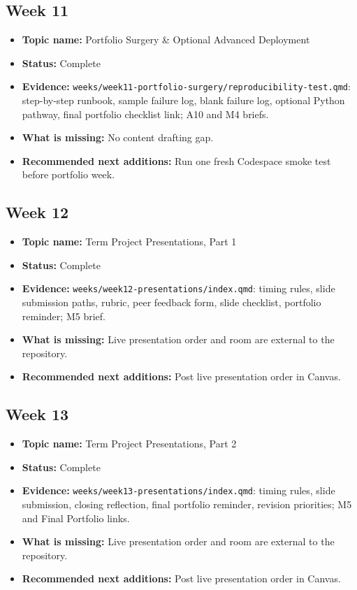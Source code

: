 \documentclass[
  letterpaper,
  DIV=11,
  numbers=noendperiod,
  oneside]{scrreprt}
\providecommand{\tightlist}{%
  \setlength{\itemsep}{0pt}\setlength{\parskip}{0pt}}
\begin{document}
\subsection{Week 11}\label{week-11}

\begin{itemize}
\tightlist
\item
  \textbf{Topic name:} Portfolio Surgery \& Optional Advanced Deployment
\item
  \textbf{Status:} Complete
\item
  \textbf{Evidence:}
  \texttt{weeks/week11-portfolio-surgery/reproducibility-test.qmd}:
  step-by-step runbook, sample failure log, blank failure log, optional
  Python pathway, final portfolio checklist link; A10 and M4 briefs.
\item
  \textbf{What is missing:} No content drafting gap.
\item
  \textbf{Recommended next additions:} Run one fresh Codespace smoke
  test before portfolio week.
\end{itemize}

\subsection{Week 12}\label{week-12}

\begin{itemize}
\tightlist
\item
  \textbf{Topic name:} Term Project Presentations, Part 1
\item
  \textbf{Status:} Complete
\item
  \textbf{Evidence:} \texttt{weeks/week12-presentations/index.qmd}:
  timing rules, slide submission paths, rubric, peer feedback form,
  slide checklist, portfolio reminder; M5 brief.
\item
  \textbf{What is missing:} Live presentation order and room are
  external to the repository.
\item
  \textbf{Recommended next additions:} Post live presentation order in
  Canvas.
\end{itemize}

\subsection{Week 13}\label{week-13}

\begin{itemize}
\tightlist
\item
  \textbf{Topic name:} Term Project Presentations, Part 2
\item
  \textbf{Status:} Complete
\item
  \textbf{Evidence:} \texttt{weeks/week13-presentations/index.qmd}:
  timing rules, slide submission, closing reflection, final portfolio
  reminder, revision priorities; M5 and Final Portfolio links.
\item
  \textbf{What is missing:} Live presentation order and room are
  external to the repository.
\item
  \textbf{Recommended next additions:} Post live presentation order in
  Canvas.
\end{itemize}
\end{document}
